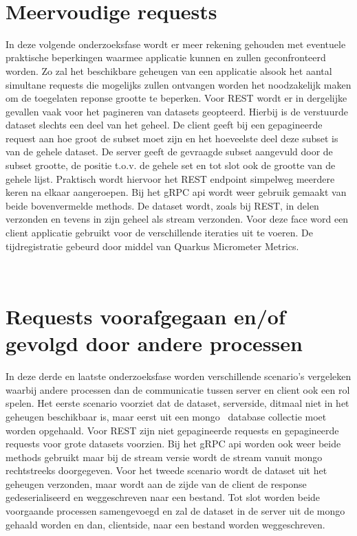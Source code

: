~\autocite{Postman}\\

\section{Meervoudige requests}

In deze volgende onderzoeksfase wordt er meer rekening gehouden met eventuele praktische beperkingen waarmee applicatie kunnen en zullen geconfronteerd worden.
Zo zal het beschikbare geheugen van een applicatie alsook het aantal simultane requests die mogelijks zullen ontvangen worden het noodzakelijk maken om
de toegelaten reponse grootte te beperken. Voor REST wordt er in dergelijke gevallen vaak voor het pagineren van datasets geopteerd.
Hierbij is de verstuurde dataset slechts een deel van het geheel. De client geeft bij een gepagineerde request aan hoe groot de subset moet zijn
en het hoeveelste deel deze subset is van de gehele dataset. De server geeft de gevraagde subset aangevuld door de subset grootte, de positie t.o.v. de gehele set
en tot slot ook de grootte van de gehele lijst. Praktisch wordt hiervoor het REST endpoint simpelweg meerdere keren na elkaar aangeroepen.
Bij het gRPC api wordt weer gebruik gemaakt van beide bovenvermelde methods. De dataset wordt, zoals bij REST, in delen verzonden en tevens in zijn geheel als stream verzonden.
Voor deze face word een client applicatie gebruikt voor de verschillende iteraties uit te voeren. De tijdregistratie gebeurd door middel van Quarkus Micrometer Metrics.

~\autocite{quarkusMicrometer}\\

\section{Requests voorafgegaan en/of gevolgd door andere processen}

In deze derde en laatste onderzoeksfase worden verschillende scenario's vergeleken waarbij andere processen dan de communicatie tussen server en client
ook een rol spelen. \newline
Het eerste scenario voorziet dat de dataset, serverside, ditmaal niet in het geheugen beschikbaar is, maar eerst uit een mongo~\parencite{MongoDB} database collectie moet worden opgehaald.
Voor REST zijn niet gepagineerde requests en gepagineerde requests voor grote datasets voorzien. Bij het gRPC api worden ook weer beide methods gebruikt maar bij de stream versie
wordt de stream vanuit mongo rechtstreeks doorgegeven. \newline
Voor het tweede scenario wordt de dataset uit het geheugen verzonden, maar wordt aan de zijde van de client de response gedeserialiseerd en weggeschreven naar een bestand.
Tot slot worden beide voorgaande processen samengevoegd en zal de dataset in de server uit de mongo gehaald worden en dan, clientside, naar een bestand worden weggeschreven.

